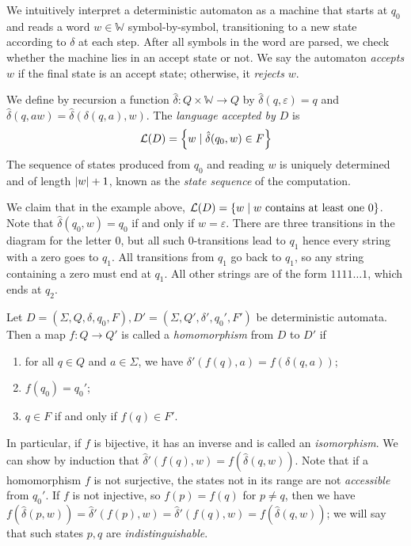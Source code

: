 We intuitively interpret a deterministic automaton as a machine that starts at \( q_0 \) and reads a word \( w \in \mathbb W \) symbol-by-symbol, transitioning to a new state according to \( \delta \) at each step.
After all symbols in the word are parsed, we check whether the machine lies in an accept state or not.
We say the automaton \emph{accepts} \( w \) if the final state is an accept state; otherwise, it \emph{rejects} \( w \).
\begin{definition}
	We define by recursion a function \( \hat\delta \colon Q \times \mathbb W \to Q \) by \( \hat\delta(q,\varepsilon) = q \) and \( \hat\delta(q,aw) = \hat\delta(\delta(q,a),w) \).
	The \emph{language accepted by \( D \)} is
	\[ \mathcal L(D) = \qty{w \mid \hat \delta(q_0, w) \in F} \]
	The sequence of states produced from \( q_0 \) and reading \( w \) is uniquely determined and of length \( \abs{w} + 1 \), known as the \emph{state sequence} of the computation.
\end{definition}
We claim that in the example above, \( \mathcal L(D) = \qty{w \mid w \text{ contains at least one } 0} \).
Note that \( \hat\delta(q_0,w) = q_0 \) if and only if \( w = \varepsilon \).
There are three transitions in the diagram for the letter 0, but all such 0-transitions lead to \( q_1 \) hence every string with a zero goes to \( q_1 \).
All transitions from \( q_1 \) go back to \( q_1 \), so any string containing a zero must end at \( q_1 \).
All other strings are of the form \( 1111\dots 1 \), which ends at \( q_2 \).
\begin{definition}
	Let \( D = (\Sigma, Q, \delta, q_0, F), D' = (\Sigma, Q', \delta', q_0', F') \) be deterministic automata.
	Then a map \( f \colon Q \to Q' \) is called a \emph{homomorphism} from \( D \) to \( D' \) if
	\begin{enumerate}
		\item for all \( q \in Q \) and \( a \in \Sigma \), we have \( \delta'(f(q),a) = f(\delta(q,a)) \);
		\item \( f(q_0) = q_0' \);
		\item \( q \in F \) if and only if \( f(q) \in F' \).
	\end{enumerate}
\end{definition}
In particular, if \( f \) is bijective, it has an inverse and is called an \emph{isomorphism}.
We can show by induction that \( \hat \delta'(f(q),w) = f(\hat\delta(q,w)) \).
Note that if a homomorphism \( f \) is not surjective, the states not in its range are not \emph{accessible} from \( q_0' \).
If \( f \) is not injective, so \( f(p) = f(q) \) for \( p \neq q \), then we have \( f(\hat\delta(p,w)) = \hat\delta'(f(p),w) = \hat\delta'(f(q),w) = f(\hat\delta(q,w)) \); we will say that such states \( p, q \) are \emph{indistinguishable}.
